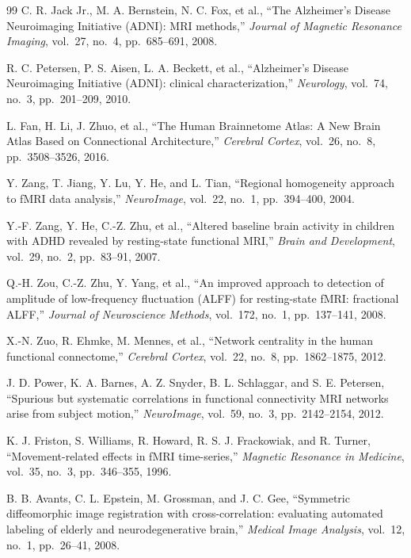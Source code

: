 \documentclass{ssnreview}
\begin{document}
\begingroup\footnotesize{}
\begin{thebibliography}{99}
 C. R. Jack Jr., M. A. Bernstein, N. C. Fox, et al., ``The
Alzheimer's Disease Neuroimaging Initiative (ADNI): MRI methods,'' \textit{Journal
of Magnetic Resonance Imaging}, vol.~27, no.~4, pp.~685--691, 2008.

 R. C. Petersen, P. S. Aisen, L. A. Beckett, et al.,
``Alzheimer's Disease Neuroimaging Initiative (ADNI): clinical characterization,''
\textit{Neurology}, vol.~74, no.~3, pp.~201--209, 2010.

 L. Fan, H. Li, J. Zhuo, et al., ``The Human Brainnetome Atlas:
A New Brain Atlas Based on Connectional Architecture,'' \textit{Cerebral Cortex},
vol.~26, no.~8, pp.~3508--3526, 2016.

 Y. Zang, T. Jiang, Y. Lu, Y. He, and L. Tian, ``Regional homogeneity
approach to fMRI data analysis,'' \textit{NeuroImage}, vol.~22, no.~1, pp.~394--400,
2004.

 Y.-F. Zang, Y. He, C.-Z. Zhu, et al., ``Altered baseline brain
activity in children with ADHD revealed by resting-state functional MRI,''
\textit{Brain and Development}, vol.~29, no.~2, pp.~83--91, 2007.

 Q.-H. Zou, C.-Z. Zhu, Y. Yang, et al., ``An improved approach to
detection of amplitude of low-frequency fluctuation (ALFF) for resting-state fMRI:
fractional ALFF,'' \textit{Journal of Neuroscience Methods}, vol.~172, no.~1,
pp.~137--141, 2008.

 X.-N. Zuo, R. Ehmke, M. Mennes, et al., ``Network centrality in
the human functional connectome,'' \textit{Cerebral Cortex}, vol.~22, no.~8,
pp.~1862--1875, 2012.

 J. D. Power, K. A. Barnes, A. Z. Snyder, B. L. Schlaggar, and S. E.
Petersen, ``Spurious but systematic correlations in functional connectivity MRI
networks arise from subject motion,'' \textit{NeuroImage}, vol.~59, no.~3,
pp.~2142--2154, 2012.

 K. J. Friston, S. Williams, R. Howard, R. S. J. Frackowiak, and
R. Turner, ``Movement-related effects in fMRI time-series,'' \textit{Magnetic
Resonance in Medicine}, vol.~35, no.~3, pp.~346--355, 1996.

 B. B. Avants, C. L. Epstein, M. Grossman, and J. C. Gee, ``Symmetric
diffeomorphic image registration with cross-correlation: evaluating automated
labeling of elderly and neurodegenerative brain,'' \textit{Medical Image Analysis},
vol.~12, no.~1, pp.~26--41, 2008.


\end{thebibliography}
\end{document}
